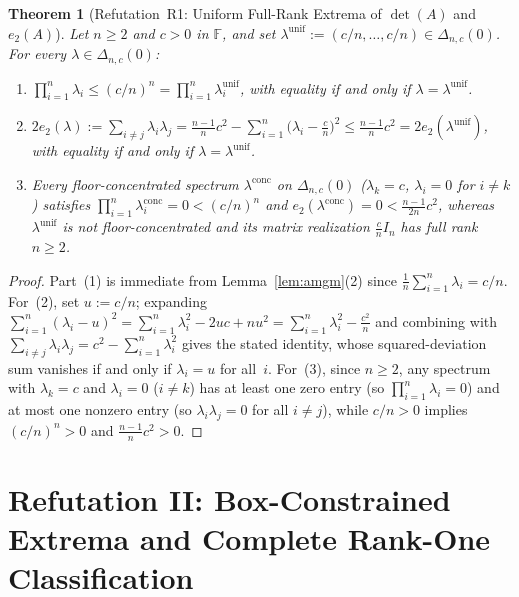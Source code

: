 \documentclass[11pt]{article}
\newtheorem{theorem}{Theorem}[section]
\theoremstyle{definition}
\theoremstyle{remark}
\begin{document}
\begin{theorem}[Refutation~R1: Uniform Full-Rank Extrema of $\det(A)$ and $e_2(A)$]
\label{thm:r1}
Let $n \ge 2$ and $c > 0$ in $\mathbb{F}$, and set $\lambda^{\mathrm{unif}} := (c/n, \dots, c/n) \in \Delta_{n,c}(0)$. For every $\lambda \in \Delta_{n,c}(0)$:
\begin{enumerate}
  \item $\prod_{i=1}^n \lambda_i \le (c/n)^n = \prod_{i=1}^n \lambda_i^{\mathrm{unif}}$, with equality if and only if $\lambda = \lambda^{\mathrm{unif}}$.
  \item $2 e_2(\lambda) := \sum_{i \neq j} \lambda_i \lambda_j = \frac{n-1}{n}c^2 - \sum_{i=1}^n \bigl(\lambda_i - \frac{c}{n}\bigr)^2 \le \frac{n-1}{n}c^2 = 2 e_2(\lambda^{\mathrm{unif}})$, with equality if and only if $\lambda = \lambda^{\mathrm{unif}}$.
  \item Every floor-concentrated spectrum $\lambda^{\mathrm{conc}}$ on $\Delta_{n,c}(0)$ ($\lambda_k = c$, $\lambda_i = 0$ for $i \neq k$) satisfies $\prod_{i=1}^n \lambda_i^{\mathrm{conc}} = 0 < (c/n)^n$ and $e_2(\lambda^{\mathrm{conc}}) = 0 < \frac{n-1}{2n}c^2$, whereas $\lambda^{\mathrm{unif}}$ is not floor-concentrated and its matrix realization $\frac{c}{n}I_n$ has full rank $n \ge 2$.
\end{enumerate}
\end{theorem}

\begin{proof}
Part~(1) is immediate from Lemma~\ref{lem:amgm}(2) since $\frac{1}{n}\sum_{i=1}^n \lambda_i = c/n$. For~(2), set $u := c/n$; expanding $\sum_{i=1}^n (\lambda_i - u)^2 = \sum_{i=1}^n \lambda_i^2 - 2 u c + n u^2 = \sum_{i=1}^n \lambda_i^2 - \frac{c^2}{n}$ and combining with $\sum_{i \neq j} \lambda_i \lambda_j = c^2 - \sum_{i=1}^n \lambda_i^2$ gives the stated identity, whose squared-deviation sum vanishes if and only if $\lambda_i = u$ for all~$i$. For~(3), since $n \ge 2$, any spectrum with $\lambda_k = c$ and $\lambda_i = 0$ ($i \neq k$) has at least one zero entry (so $\prod_{i=1}^n \lambda_i = 0$) and at most one nonzero entry (so $\lambda_i \lambda_j = 0$ for all $i \neq j$), while $c/n > 0$ implies $(c/n)^n > 0$ and $\frac{n-1}{n}c^2 > 0$.
\end{proof}

\section{Refutation II: Box-Constrained Extrema and Complete Rank-One Classification}
\label{sec:r2}
\end{document}
